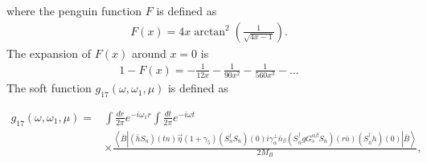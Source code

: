 where the penguin function $F$ is defined as 
\begin{eqnarray}\label{eqn:chapter3_penguin_fn}
F(x)=4 x \arctan ^{2}\left(\frac{1}{\sqrt{4 x-1}}\right).
\end{eqnarray}
The expansion of $F(x)$ around $x=0$ is
\begin{eqnarray}\label{eqn:chapter3_F_expansion}
1-F(x)=-\frac{1}{12 x}-\frac{1}{90 x^{2}}-\frac{1}{560 x^{3}}-\dots
\end{eqnarray}
The soft function $g_{17}\left(\omega, \omega_{1}, \mu\right)$  is defined as

\begin{align}\label{eqn:chapter3_suleadinhg_SSf}
g_{17}\left(\omega, \omega_{1}, \mu\right)=& \int \frac{d r}{2 \pi} e^{-i \omega_{1} r} \int \frac{d t}{2 \pi} e^{-i \omega t} \nonumber\\
& \times \frac{\left\langle\bar{B}\left|\left(\bar{h} S_{n}\right)(t n) \vec{\eta}\left(1+\gamma_{5}\right)\left(S_{n}^{\dagger} S_{\bar{n}}\right)(0) i \gamma_{\alpha}^{\perp} \bar{n}_{\beta}\left(S_{\bar{n}}^{\dagger} g G_{s}^{\alpha \beta} S_{\bar{n}}\right)(r \bar{n})\left(S_{\bar{n}}^{\dagger} h\right)(0)\right| \bar{B}\right\rangle}{2 M_{B}},\nonumber\\
\end{align}

